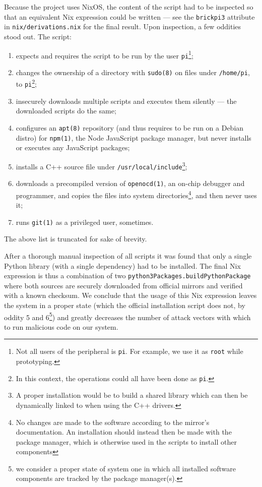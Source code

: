 Because the project uses NixOS, the content of the script had to be inspected so that an equivalent Nix expression could be written ---
see the \texttt{brickpi3} attribute in \texttt{nix/derivations.nix} for the final result.
Upon inspection, a few oddities stood out. The script:
\begin{enumerate}
\item expects and requires the script to be run by the user \texttt{pi}\footnote{Not all users of the peripheral is \texttt{pi}. For example, we use it as \texttt{root} while prototyping.};
\item changes the ownership of a directory with \texttt{sudo(8)} on files under \texttt{/home/pi}, to \texttt{pi}\footnote{In this context, the operations could all have been done as \texttt{pi}.};
\item insecurely downloads multiple scripts and executes them silently --- the downloaded scripts do the same;
\item configures an \texttt{apt(8)} repository (and thus requires to be run on a Debian distro) for \texttt{npm(1)},
  the Node JavaScript package manager, but never installs or executes any JavaScript packages;
\item installs a C++ source file under \texttt{/usr/local/include}\footnote{A proper installation would be to build a shared library which can then be dynamically linked to when using the C++ drivers.};
\item downloads a precompiled version of \texttt{openocd(1)}, an on-chip debugger and programmer,
  and copies the files into system directories\footnote{No changes are made to the software according to the mirror's documentation. An installation should instead then be made with the package manager, which is otherwise used in the scripts to install other components}, and then never uses it;
\item runs \texttt{git(1)} as a privileged user, sometimes.
\end{enumerate}
The above list is truncated for sake of brevity.

After a thorough manual inspection of all scripts it was found that only a single Python library (with a single dependency) had to be installed.
The final Nix expression is thus a combination of two \texttt{python3Packages.buildPythonPackage} where both sources are securely downloaded from official mirrors and verified with a known checksum.
We conclude that the usage of this Nix expression leaves the system in a proper state (which the official installation script does not, by oddity 5 and 6\footnote{we consider a proper state of system one in which all installed software components are tracked by the package manager(s).}) and greatly decreases the number of attack vectors with which to run malicious code on our system.

